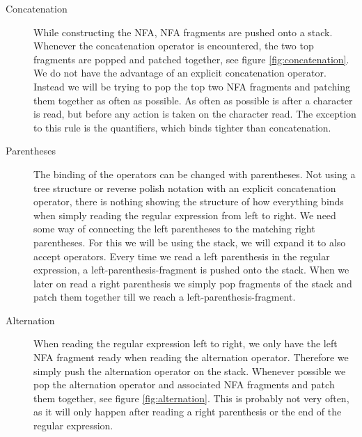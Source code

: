 \begin{description}
\item[Concatenation] While constructing the NFA, NFA fragments are
  pushed onto a stack. Whenever the concatenation operator is
  encountered, the two top fragments are popped and patched together,
  see figure \vref{fig:concatenation}. We do not have the advantage of
  an explicit concatenation operator. Instead we will be trying to pop
  the top two NFA fragments and patching them together as often as
  possible. As often as possible is after a character is read, but
  before any action is taken on the character read. The exception to
  this rule is the quantifiers, which binds tighter than
  concatenation.
\item[Parentheses] The binding of the operators can be changed with
  parentheses. Not using a tree structure or reverse polish notation
  with an explicit concatenation operator, there is nothing showing
  the structure of how everything binds when simply reading the
  regular expression from left to right. We need some way of
  connecting the left parentheses to the matching right
  parentheses. For this we will be using the stack, we will expand it
  to also accept operators. Every time we read a left parenthesis in
  the regular expression, a left-parenthesis-fragment is pushed onto
  the stack. When we later on read a right parenthesis we simply pop
  fragments of the stack and patch them together till we reach a
  left-parenthesis-fragment.   
\item[Alternation] When reading the regular expression left to right,
  we only have the left NFA fragment ready when reading the
  alternation operator. Therefore we simply push the alternation
  operator on the stack. Whenever possible we pop the alternation
  operator and associated NFA fragments and patch them together, see
  figure \vref{fig:alternation}. This is probably not very often, as
  it will only happen after reading a right parenthesis or the end of
  the regular expression.
\end{description}



